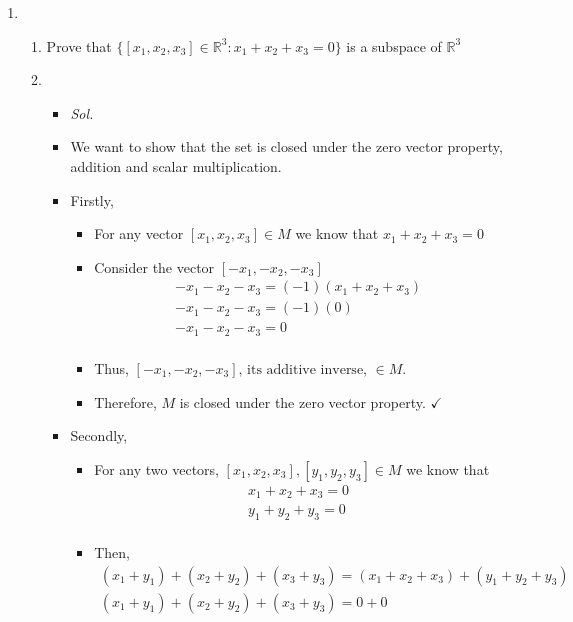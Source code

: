 \documentclass[11pt]{article}
\newcommand{\R}{\mathbb{R}}
\begin{document}
\begin{enumerate}
  \clearpage
	\item 
	\begin{enumerate}
		\item Prove that $\{ [x_1,x_2,x_3] \in \R^3 \colon x_1 + x_2 + x_3 = 0 \}$ is a subspace of $\R^3$
    \item[] \begin{itemize} 
        \item[]  \textit{ Sol. }
        \item[] We want to show that the set is closed under the zero vector 
          property, addition and scalar multiplication. 
        \item[] Firstly, \begin{itemize}
            \item[] For any vector $[x_1, x_2, x_3] \in M$ we know that 
                $x_1 + x_2 + x_3 = 0$ 
            \item[] Consider the vector $[-x_1, -x_2, -x_3]$ \begin{align*}
                -x_1 - x_2 - x_3 = (-1)(x_1 + x_2 + x_3) \\
                -x_1 - x_2 - x_3 = (-1)(0) \\
                -x_1 - x_2 - x_3 = 0 \\
              \end{align*}
            \item[] Thus, $[-x_1, -x_2, -x_3] \text{, its additive inverse, } \in M$. 
            \item[] Therefore, $M$ is closed under the zero vector property. $\checkmark$ 
          \end{itemize}
        \item[] Secondly,
            \begin{itemize}
              \item[] For any two vectors, $[x_1, x_2, x_3], [y_1, y_2, y_3] \in M$ 
                we know that \begin{align*}
                x_1 + x_2 + x_3 = 0 \\
                y_1 + y_2 + y_3 = 0 \\
              \end{align*}
            \item[] Then, \begin{align*}
                (x_1 + y_1) + (x_2 + y_2) + (x_3 + y_3) = (x_1 + x_2 + x_3) +
                                                          (y_1 + y_2 + y_3)\\ 
                (x_1 + y_1) + (x_2 + y_2) + (x_3 + y_3)= 0 + 0 \\

\end{align*}
\end{itemize}
\end{itemize}
\end{enumerate}
\end{enumerate}
\end{document}

